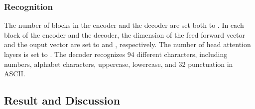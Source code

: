 \begin{table}[h]
\centering
\caption{Feature extraction network configurations.Each block is a residual network block. "s" stands for stride of the first convolutional layer in a block.}
\label{tab:FEarchitecture}
\end{table}

\subsubsection{Recognition}
The number of blocks in the encoder and the decoder are set both to .
In each block of the encoder and the decoder, the dimension of the feed forward vector and the ouput vector are set to  and , respectively.
The number of head attention layers is set to .
The decoder recognizes 94 different characters, including numbers, alphabet characters, uppercase, lowercase, and 32 punctuation in ASCII.

\subsection{Result and Discussion}
